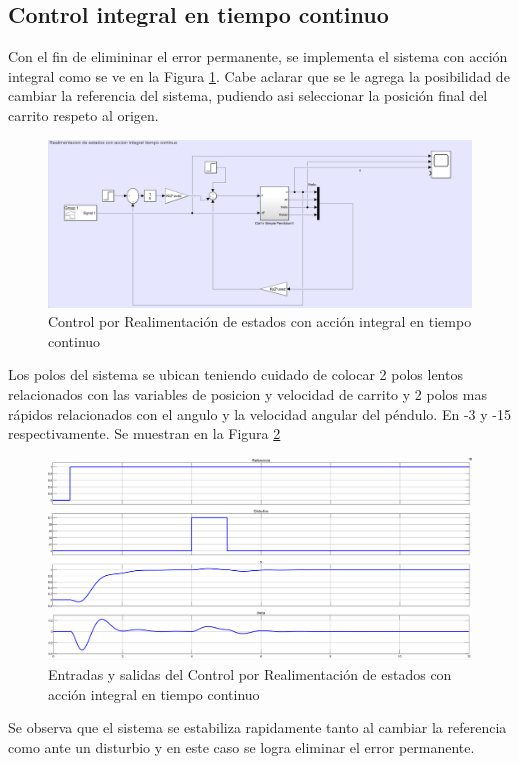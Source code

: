 \subsection{Control integral en tiempo continuo}
Con el fin de elimininar el error permanente, se implementa el sistema con acci\'on integral como se ve en la Figura \ref{fig:integralFeed}. Cabe aclarar que se le agrega la posibilidad de cambiar la referencia del sistema, pudiendo asi seleccionar la posici\'on final del carrito respeto al origen.
\begin{figure}[H]
	\centering
	\includegraphics[width=0.8\linewidth]{ImagenesRealimentacióndeEstados/integralFeed}
	\caption{Control por Realimentaci\'on de estados con acci\'on integral en tiempo continuo}	
	\label{fig:integralFeed}
\end{figure}
Los polos del sistema se ubican teniendo cuidado de colocar 2 polos lentos relacionados con las variables de posicion y velocidad de carrito y 2 polos mas r\'apidos relacionados con el angulo y la velocidad angular del p\'endulo. En -3 y -15 respectivamente.\newline
Se muestran en la Figura \ref{fig:integralFeedOut}
\begin{figure}[H]
	\centering
	\includegraphics[width=0.8\linewidth]{ImagenesRealimentacióndeEstados/integralFeedOut}
	\caption{Entradas y salidas del Control por Realimentaci\'on de estados con acci\'on integral en tiempo continuo}	
	\label{fig:integralFeedOut}
\end{figure}
Se observa que el sistema se estabiliza rapidamente tanto al cambiar la referencia como ante un disturbio y en este caso se logra eliminar el error permanente.
